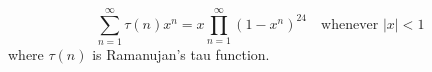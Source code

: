 $$\sum_{n=1}^{\infty}\tau(n)x^n = x\prod_{n=1}^{\infty}(1-x^n)^{24} \quad \text{whenever } |x| < 1$$
where $\tau(n)$ is Ramanujan's tau function.
